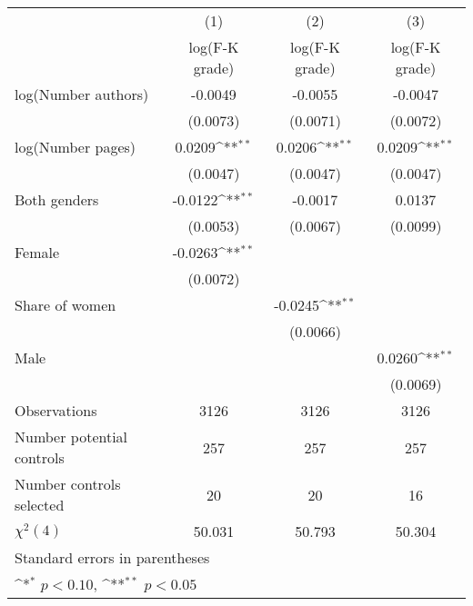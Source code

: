 {
\def\sym#1{\ifmmode^{#1}\else\(^{#1}\)\fi}
\begin{tabular}{l*{3}{c}}
\hline\hline
                    &\multicolumn{1}{c}{(1)}&\multicolumn{1}{c}{(2)}&\multicolumn{1}{c}{(3)}\\
                    &\multicolumn{1}{c}{log(F-K grade)}&\multicolumn{1}{c}{log(F-K grade)}&\multicolumn{1}{c}{log(F-K grade)}\\
\hline
\hspace{3mm}log(Number authors)&     -0.0049        &     -0.0055        &     -0.0047        \\
                    &    (0.0073)        &    (0.0071)        &    (0.0072)        \\
[1em]
\hspace{3mm}log(Number pages)&      0.0209\sym{**}&      0.0206\sym{**}&      0.0209\sym{**}\\
                    &    (0.0047)        &    (0.0047)        &    (0.0047)        \\
[1em]
\hspace{3mm}Both genders&     -0.0122\sym{**}&     -0.0017        &      0.0137        \\
                    &    (0.0053)        &    (0.0067)        &    (0.0099)        \\
[1em]
\hspace{3mm}Female  &     -0.0263\sym{**}&                    &                    \\
                    &    (0.0072)        &                    &                    \\
[1em]
\hspace{3mm}Share of women&                    &     -0.0245\sym{**}&                    \\
                    &                    &    (0.0066)        &                    \\
[1em]
\hspace{3mm}Male    &                    &                    &      0.0260\sym{**}\\
                    &                    &                    &    (0.0069)        \\
\hline
Observations        &        3126        &        3126        &        3126        \\
Number potential controls&         257        &         257        &         257        \\
Number controls selected&          20        &          20        &          16        \\
$\chi^2(4)$         &      50.031        &      50.793        &      50.304        \\
\hline\hline
\multicolumn{4}{l}{\footnotesize Standard errors in parentheses}\\
\multicolumn{4}{l}{\footnotesize \sym{*} \(p<0.10\), \sym{**} \(p<0.05\)}\\
\end{tabular}
}

